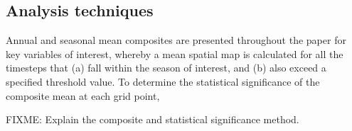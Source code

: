 \subsection{Analysis techniques}

Annual and seasonal mean composites are presented throughout the paper for key variables of interest, whereby a mean spatial map is calculated for all the timesteps that (a) fall within the season of interest, and (b) also exceed a specified threshold value. To determine the statistical significance of the composite mean at each grid point,   


FIXME: Explain the composite and statistical significance method.